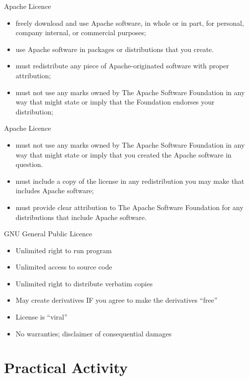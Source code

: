 \begin{frame}{Apache Licence}
	\begin{itemize}
		\item freely download and use Apache software, in whole or in part, for personal, company
		 internal, or commercial purposes;
		\item use Apache software in packages or distributions that you create.
		\item must redistribute any piece of Apache-originated software with proper attribution;
		\item must not use any marks owned by The Apache Software Foundation in any way that 
		might state or imply that the Foundation endorses your distribution;
	\end{itemize}
\end{frame}

\begin{frame}{Apache Licence}
	\begin{itemize}
		\item must not use any marks owned by The Apache Software Foundation in any way that
		 might state or imply that you created the Apache software in question.
		\item must include a copy of the license in any redistribution you may make that includes Apache software;
		\item must provide clear attribution to The Apache Software Foundation for any distributions that include Apache software.
	\end{itemize}
\end{frame}

\begin{frame}{GNU General Public Licence}
	\begin{itemize}
		\item Unlimited right to run program
		\item Unlimited access to source code
		\item Unlimited right to distribute verbatim copies
		\item May create derivatives IF you agree to make the derivatives “free”
		\item License is “viral”
		\item No warranties; disclaimer of consequential damages
	\end{itemize}
\end{frame}

\part{Practical Activity}
\frame{\partpage}

